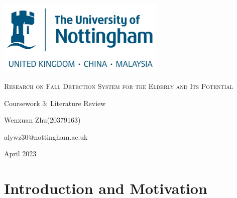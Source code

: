 \documentclass[12pt]{article}
\begin{document}
\begin{titlepage}
    \centering
    \includegraphics[width=0.6\textwidth]{Logo.png}\par\vspace{1cm}
    \vspace{1cm}
    {\scshape\LARGE Research on Fall Detection System for the Elderly and Its Potential\par}
    \vspace{2.5cm}
    {\Large Coursework 3: Literature Review\par}
    \vspace{6cm}
    {\Large Wenxuan Zhu(20379163)\par}
    \vspace{0.5cm}
    {\Large alywz30@nottingham.ac.uk\par}
    \vfill
    {\Large April 2023\par}
\end{titlepage}

\section{Introduction and Motivation}
\end{document}
